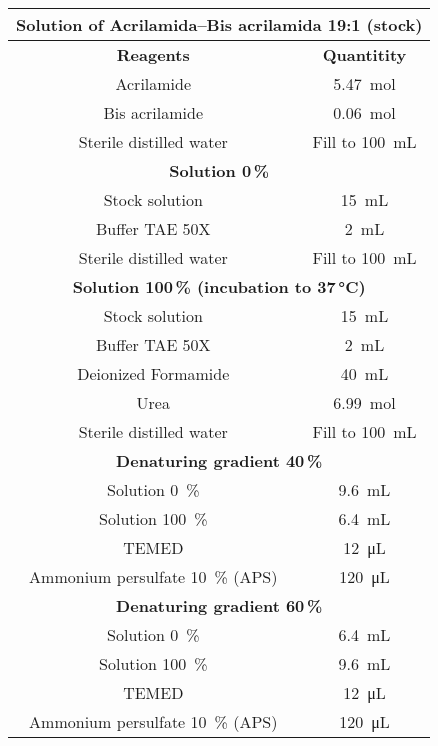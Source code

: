 \begin{tabular}{@{}cc@{}}
        \toprule
        \multicolumn{2}{c}{\textbf{Solution of Acrilamida–Bis acrilamida 19:1 (stock)}} \\ \midrule
        \multicolumn{1}{c}{\textbf{Reagents}} & \textbf{Quantitity} \\ \midrule
        Acrilamide & \SI{5.47}{mol} \\
        Bis acrilamide & \SI{0.06}{mol} \\
        Sterile distilled water & Fill to \SI{100}{mL} \\ \midrule
        \multicolumn{2}{c}{\textbf{Solution 0\,\%}} \\ \midrule
        Stock solution & \SI{15}{mL} \\
        Buffer TAE 50X & \SI{2}{mL} \\
        Sterile distilled water & Fill to \SI{100}{mL} \\ \midrule
        \multicolumn{2}{c}{\textbf{Solution 100\,\% (incubation to 37\,°C)}} \\ \midrule
        Stock solution & \SI{15}{mL} \\
        Buffer TAE 50X & \SI{2}{mL} \\
        Deionized Formamide & \SI{40}{mL} \\
        Urea & \SI{6.99}{mol} \\
        Sterile distilled water & Fill to \SI{100}{mL} \\ \midrule
        \multicolumn{2}{c}{\textbf{Denaturing gradient 40\,\%}} \\ \midrule
        Solution \SI{0}{\%} & \SI{9.6}{mL} \\
        Solution \SI{100}{\%} & \SI{6.4}{mL} \\
        TEMED & \SI{12}{\micro L} \\
        Ammonium persulfate \SI{10}{\%} (APS) & \SI{120}{\micro L} \\ \midrule
        \multicolumn{2}{c}{\textbf{Denaturing gradient 60\,\%}} \\ \midrule
        Solution \SI{0}{\%} & \SI{6.4}{mL} \\
        Solution \SI{100}{\%} & \SI{9.6}{mL} \\
        TEMED & \SI{12}{\micro L} \\ 
        Ammonium persulfate \SI{10}{\%} (APS) & \SI{120}{\micro L} \\ \bottomrule
\end{tabular}
